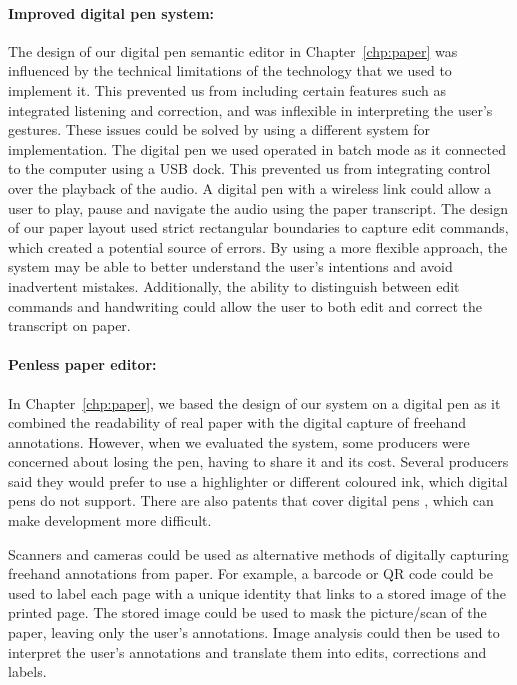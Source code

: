 \paragraph{Improved digital pen system:}

The design of our digital pen semantic editor in Chapter~\ref{chp:paper} was influenced by the technical limitations of
the technology that we used to implement it.  This prevented us from including certain features such as integrated
listening and correction, and was inflexible in interpreting the user's gestures.  These issues could be solved by
using a different system for implementation.  The digital pen we used operated in batch mode as it connected to the
computer using a USB dock. This prevented us from integrating control over the playback of the audio. A digital pen
with a wireless link could allow a user to play, pause and navigate the audio using the paper transcript.  The design
of our paper layout used strict rectangular boundaries to capture edit commands, which created a potential source of
errors. By using a more flexible approach, the system may be able to better understand the user's intentions and avoid
inadvertent mistakes.  Additionally, the ability to distinguish between edit commands and handwriting could allow the
user to both edit and correct the transcript on paper.

\paragraph{Penless paper editor:}

In Chapter~\ref{chp:paper}, we based the design of our system on a digital pen as it combined the readability of real
paper with the digital capture of freehand annotations. However, when we evaluated the system, some producers were
concerned about losing the pen, having to share it and its cost. Several producers said they would prefer to use a
highlighter or different coloured ink, which digital pens do not support. There are also patents that cover digital
pens \citep{Fahraeus2003}, which can make development more difficult.

Scanners and cameras could be used as alternative methods of digitally capturing freehand annotations from paper.  For
example, a barcode or QR code could be used to label each page with a unique identity that links to a stored image of
the printed page. The stored image could be used to mask the picture/scan of the paper, leaving only the user's
annotations. Image analysis could then be used to interpret the user's annotations and translate them into edits,
corrections and labels.

